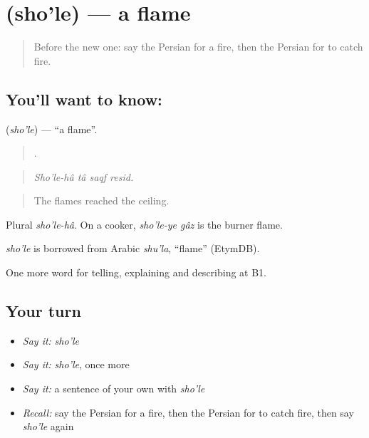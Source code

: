 \section[\texorpdfstring{\fa{شعله} (sho'le)}{شعله (sho'le)}]{ (sho'le) — a flame}

\label{lesson:FA-C328-shole}



\begin{quote}
Before the new one: say the Persian for a fire, then the Persian for to catch fire.
\end{quote}

\subsection*{You'll want to know: }
\textbf{} (\emph{sho'le}) — \textquotedblleft{}a flame\textquotedblright{}.

\begin{quote}
    .
\end{quote}

\begin{quote}
\emph{Sho'le-hâ tâ saqf resid.}
\end{quote}

\begin{quote}
The flames reached the ceiling.
\end{quote}

Plural \emph{sho'le-hâ}. On a cooker, \emph{sho'le-ye gâz} is the burner flame.

\begin{cousinweb}
\emph{sho'le} is borrowed from Arabic \emph{shu'la}, \textquotedblleft{}flame\textquotedblright{} (EtymDB).
\end{cousinweb}

\begin{grammarlens}[title={What you've built}]
One more word for telling, explaining and describing at B1.
\end{grammarlens}

\subsection*{Your turn}
\begin{itemize}
\raggedright
  \item \emph{Say it:} \emph{sho'le}
  \item \emph{Say it:} \emph{sho'le}, once more
  \item \emph{Say it:} a sentence of your own with \emph{sho'le}
  \item \emph{Recall:} say the Persian for a fire, then the Persian for to catch fire, then say \emph{sho'le} again
\end{itemize}

